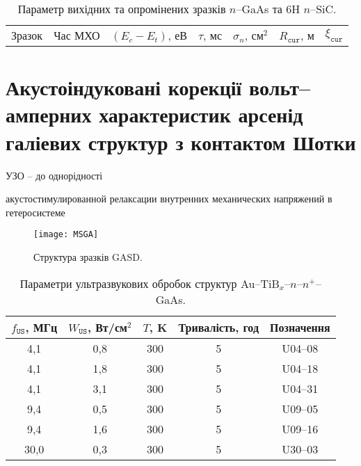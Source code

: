 \documentclass[a4paper,14pt,oneside,openany]{memoir}
\begin{document}
\begin{table}
\caption{\label{tabMW}Параметр вихідних та опромінених зразків $n$--GaAs та 6H $n$--SiC.
}
\center
\begin{tabular}{|c|c|c|c|c|c|c|}
\hline
Зразок& Час МХО & $(E_c-E_t)$, еВ &$\tau$, мс&$\sigma_n$, см$^2$&$R_\mathtt{cur}$, м&$\xi_\mathtt{cur}$\\
\end{tabular}
\end{table}

\section{Акустоіндуковані корекції вольт--амперних характеристик арсенід галіевих структур з контактом Шотки\label{MSGA}}

\cite{SBD:rizn}

УЗО -- до однорідності \cite{UST:SDErmol}

акустостимулированной релаксации внутренних механических напряжений в гетеросистеме \cite{BritunFTT}

\cite{Parchinskii2003r,Ostrov2002FTPr,Singh1994,Evstropov2000,Tseng1987}


\begin{figure}[b]
\center
\texttt{[image: MSGA]}%
\caption{\label{figMSGA}
Структура зразків GASD.
}
\end{figure}

\begin{table}
\caption{\label{tabUST}Параметри ультразвукових обробок структур Au--TiB$_x$--$n$--$n^+$--GaAs.
}
\center
\begin{tabular}{|c|c|c|c|c|}
\hline
$f_\mathtt{US}$, МГц&$W_{\mathtt{US}}$, Вт/см$^2$&$T$, K&Тривалість, год &Позначення\\
\hline
4,1&0,8&300&5&U04--08\\ \hline
4,1&1,8&300&5&U04--18\\ \hline
4,1&3,1&300&5&U04--31\\ \hline
9,4&0,5&300&5&U09--05\\ \hline
9,4&1,6&300&5&U09--16\\ \hline
30,0&0,3&300&5&U30--03\\ \hline
\end{tabular}
\end{table}
\end{document}
